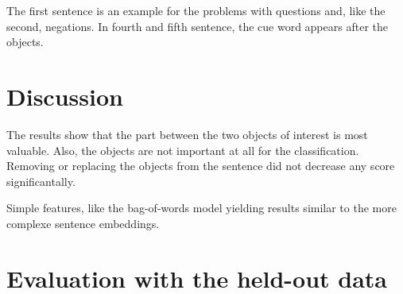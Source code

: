 The first sentence is an example for the problems with questions and, like the second, negations. In fourth and fifth sentence, the cue word appears after the objects.

\section{Discussion}
The results show that the part between the two objects of interest is most valuable. Also, the objects are not important at all for the classification. Removing or replacing the objects from the sentence did not decrease any score significantally.

Simple features, like the bag-of-words model yielding results similar to the more complexe sentence embeddings.

\section{Evaluation with the held-out data}
\label{sec:final}

